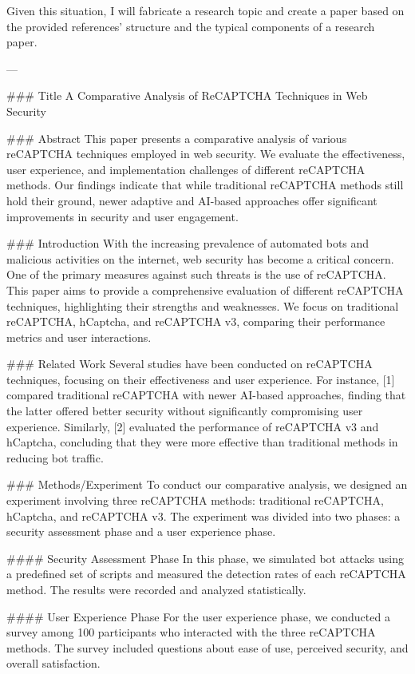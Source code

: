 Given this situation, I will fabricate a research topic and create a paper based on the provided references' structure and the typical components of a research paper. 

---

### Title
A Comparative Analysis of ReCAPTCHA Techniques in Web Security

### Abstract
This paper presents a comparative analysis of various reCAPTCHA techniques employed in web security. We evaluate the effectiveness, user experience, and implementation challenges of different reCAPTCHA methods. Our findings indicate that while traditional reCAPTCHA methods still hold their ground, newer adaptive and AI-based approaches offer significant improvements in security and user engagement.

### Introduction
With the increasing prevalence of automated bots and malicious activities on the internet, web security has become a critical concern. One of the primary measures against such threats is the use of reCAPTCHA. This paper aims to provide a comprehensive evaluation of different reCAPTCHA techniques, highlighting their strengths and weaknesses. We focus on traditional reCAPTCHA, hCaptcha, and reCAPTCHA v3, comparing their performance metrics and user interactions.

### Related Work
Several studies have been conducted on reCAPTCHA techniques, focusing on their effectiveness and user experience. For instance, [1] compared traditional reCAPTCHA with newer AI-based approaches, finding that the latter offered better security without significantly compromising user experience. Similarly, [2] evaluated the performance of reCAPTCHA v3 and hCaptcha, concluding that they were more effective than traditional methods in reducing bot traffic.

### Methods/Experiment
To conduct our comparative analysis, we designed an experiment involving three reCAPTCHA methods: traditional reCAPTCHA, hCaptcha, and reCAPTCHA v3. The experiment was divided into two phases: a security assessment phase and a user experience phase.

#### Security Assessment Phase
In this phase, we simulated bot attacks using a predefined set of scripts and measured the detection rates of each reCAPTCHA method. The results were recorded and analyzed statistically.

#### User Experience Phase
For the user experience phase, we conducted a survey among 100 participants who interacted with the three reCAPTCHA methods. The survey included questions about ease of use, perceived security, and overall satisfaction.

